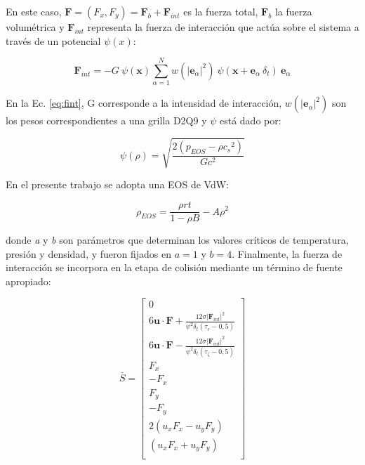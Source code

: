 En este caso, $ {\mathbf{F}} = (F_{x} , F_{y} ) = {\mathbf{F}}_{b} + {\mathbf{F}}_{int} $ es la fuerza total, ${\mathbf{F}}_{b}$ la fuerza volumétrica y ${\mathbf{F}}_{int}$ representa la fuerza de interacción que actúa sobre el sistema a través de un potencial $\psi(x)$:
    
\begin{equation}
    {\mathbf{F}}_{int} = - G \> \psi(\mathbf{x}) \sum_{\alpha=1}^{N} w({|{\mathbf{e}}_{\alpha}|}^{2}) \> \psi (\mathbf{x} + {\mathbf{e}}_{\alpha} \> \delta_{t}) \> {\mathbf{e}}_{\alpha} 
    \label{eq:fint}
\end{equation}

En la Ec. \ref{eq:fint}, G corresponde a la intensidad de interacción, $w({|{\mathbf{e}}_{\alpha}|}^{2})$ son los pesos correspondientes a una grilla D2Q9 y $\psi$ está dado por:

\begin{equation} 
    \psi(\rho) = \sqrt{\frac{2 (p_{EOS} - \rho {c_{s}}^{2})}{G {c}^{2}}}
\end{equation}

En el presente trabajo se adopta una EOS de VdW:

\begin{equation}
    \rho_{EOS} = \frac{\rho r t}{1- \rho B} - A {\rho}^{2}
\end{equation}

donde \textit{a} y \textit{b} son parámetros que determinan los valores críticos de temperatura, presión y densidad, y fueron fijados en $\textit{a} = 1$ y $\textit{b} = 4$. Finalmente, la fuerza de interacción se incorpora en la etapa de colisión mediante un término de fuente apropiado:

\begin{equation}
    \bar{S} = 
    \left[ \begin{array}{c} 
        0\\
        6 \mathbf{u}\cdot \mathbf{F} + \frac{12 \sigma {|{\mathbf{F}_{int}|}}^{2} }{{\psi}^{2} \delta_{t} (\tau_{e} - 0,5)}\\
        6 \mathbf{u}\cdot \mathbf{F} - \frac{12 \sigma {|{\mathbf{F}_{int}|}}^{2} }{{\psi}^{2} \delta_{t} (\tau_{\zeta } - 0,5)}\\
        F_{x}\\
        -F_{x}\\
        F_{y}\\
        -F_{y}\\
        2(u_{x} F_{x} - u_{y} F_{y} )\\
        (u_{x} F_{x} + u_{y} F_{y} )\\              
    \end{array}
    \right]    
\end{equation}

